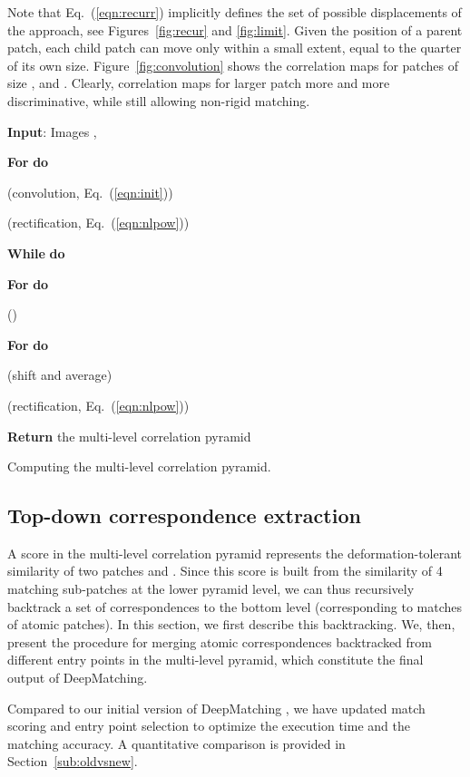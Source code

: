 \documentclass[twocolumn,natbib]{svjour3}
\def\eq{Eq.~}
\newcommand{\refp}[1]{(\ref{#1})}
\newcommand{\red}[1]{{\color{black}{#1}}}
\begin{document}
Note that \eq\refp{eqn:recurr} implicitly defines the set of
possible displacements of the approach, see Figures~\ref{fig:recur} and \ref{fig:limit}.
Given the position of a parent patch, each child patch can move only within a small extent, equal to the quarter of its own size.
Figure~\ref{fig:convolution} shows the correlation maps for patches of size ,  and . 
Clearly, correlation maps for larger patch \red{are} more and more discriminative, 
while still allowing non-rigid matching.

\begin{algorithm}
\textbf{Input}: Images ,  

\textbf{For}  \textbf{ do}

 (convolution, \eq\refp{eqn:init})

 (rectification, \eq\refp{eqn:nlpow})



\textbf{While} \red{} \textbf{do}

\textbf{For}  \textbf{ do}

 (\red{max-pooling and subsampling})




\textbf{For}  \textbf{do}

 (shift and average)

 (rectification, \eq\refp{eqn:nlpow})

\textbf{Return} the multi-level correlation pyramid 

\caption{Computing the multi-level correlation pyramid.}
\label{alg:resmap} 
\end{algorithm}

\subsection{Top-down correspondence extraction} 
\label{sub:backtrackcorrespondences}

A score  in the multi-level correlation pyramid 
represents the deformation-tolerant similarity of two patches  and .
Since this score is built from the similarity of 4 matching sub-patches at the lower pyramid level, 
we can thus recursively backtrack a set of correspondences to the bottom level (corresponding to matches of atomic patches).
In this section, we first describe this backtracking.
We, then, present the procedure for merging atomic correspondences
backtracked from different entry points in the multi-level pyramid,
which constitute the final output of DeepMatching. 

Compared to our initial version of DeepMatching \citep{DeepFlow},
we have updated match scoring and entry point selection to optimize the execution time
and the matching accuracy. A quantitative comparison is provided in Section~\ref{sub:oldvsnew}.
\end{document}

